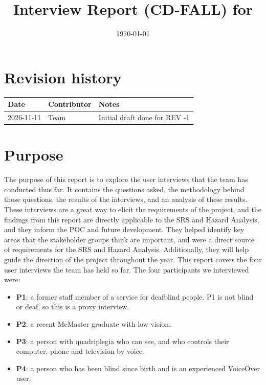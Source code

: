 \documentclass[12pt, titlepage]{article}
\begin{document}
\title{Interview Report (CD-FALL) for \progname{}} 
\author{\authname}
\date{\today}
	
\maketitle

\tableofcontents
\newpage
\section*{Revision history}

\begin{tabularx}{\textwidth}{l l X}
\toprule
\textbf{Date} & \textbf{Contributor} & \textbf{Notes}\\
\midrule
2026-11-11 & Team & Initial draft done for REV -1\\
\bottomrule
\end{tabularx}


\newpage

\section{Purpose}
The purpose of this report is to explore the user interviews that the team has conducted thus far.
It contains the questions asked, the methodology behind those questions, the results of the interviews, 
and an analysis of these results. These interviews are a great way to elicit the requirements of the project, and 
the findings from this report are directly applicable to the SRS and Hazard Analysis, and they inform the POC and future development. They helped identify 
key areas that the stakeholder groups think are important, and were a direct source of requirements for the SRS
and Hazard Analysis. Additionally, they will help guide the direction of the project throughout the year. 
This report covers the four user interviews the team has held so far. The four participants we interviewed were:
\begin{itemize}
    \item \textbf{P1}: a former staff member of a service for deafblind people. P1 is not blind or deaf, so this is a proxy interview.
    \item \textbf{P2}: a recent McMaster graduate with low vision. 
    \item \textbf{P3}: a person with quadriplegia who can see, and who controls their computer, phone and television by voice.
    \item \textbf{P4}: a person who has been blind since birth and is an experienced VoiceOver user.
\end{itemize}
\end{document}
